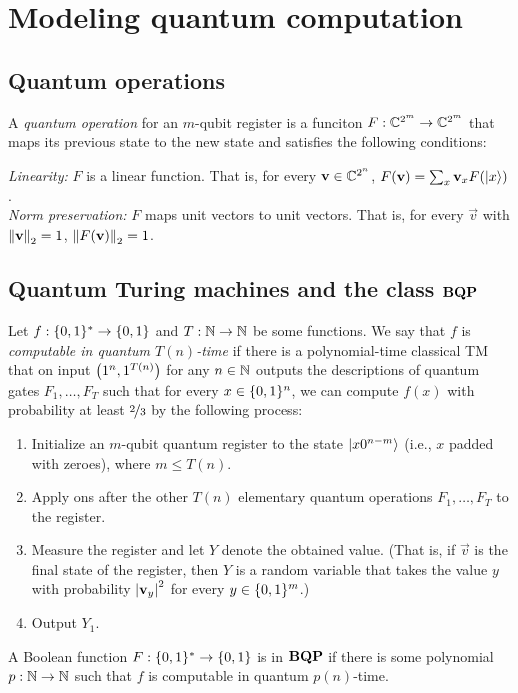 \documentclass[12pt]{article}
\begin{document}
\section{Modeling quantum computation}

\subsection{Quantum operations}
\begin{defn}
  \label{defn:op}
  A \emph{quantum operation} for an $m$-qubit register is a funciton $F :
  \CC^{2^m} \to \CC^{2^m}$ that maps its previous state to the new state and
  satisfies the following conditions:
  \begin{adjustwidth}{0.25in}{0in}
    \emph{Linearity:} $F$ is a linear function. That is, for every $\vec{v} \in
    \CC^{2^n}$, $F(\vec{v}) = \sum_x \vec{v}_x F(\reg*{x})$. \\
    \emph{Norm preservation:} $F$ maps unit vectors to unit vectors. That is,
    for every $\vec{v}$ with $\norm*{\vec{v}}_2=1$, $\norm*{F(\vec{v})}_2=1$.
  \end{adjustwidth}
\end{defn}

\subsection{Quantum Turing machines and the class $\BQP$}
\begin{defn}
  \label{defn:bqp}
  Let $f : \zo^* \to \zo$ and $T : \NN \to \NN$ be some functions. We say that
  $f$ is \emph{computable in quantum $T(n)$-time} if there is a polynomial-time
  classical TM that on input $\paren*{1^n, 1^{T(n)}}$ for any $n \in \NN$
  outputs the descriptions of quantum gates $F_1, \dots, F_T$ such that for
  every $x\in \zo^n$, we can compute $f(x)$ with probability at least
  $\nfrac{2}{3}$ by the following process:
  \begin{enumerate}
    \item Initialize an $m$-qubit quantum register to the state
      $\reg*{x0^{n-m}}$ (i.e., $x$ padded with zeroes), where $m \le T(n)$.
    \item Apply ons after the other $T(n)$ elementary quantum operations $F_1,
      \dots, F_T$ to the register.
    \item Measure the register and let $Y$ denote the obtained value. (That is,
      if $\vec{v}$ is the final state of the register, then $Y$ is a random
      variable that takes the value $y$ with probability $\abs*{\vec{v}_y}^2$
      for every $y \in \zo^m$.)
    \item Output $Y_1$.
  \end{enumerate}
  A Boolean function $F : \zo^* \to \zo$ is in $\BQP$ if there is some
  polynomial $p : \NN \to \NN$ such that $f$ is computable in quantum
  $p(n)$-time.
\end{defn}
\end{document}
